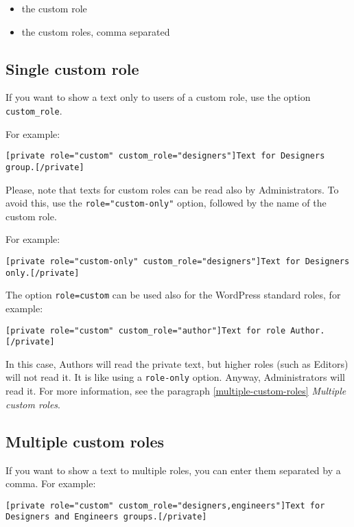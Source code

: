 \begin{itemize}
 \item the custom role
 \item the custom roles, comma separated
\end{itemize}

\subsection{Single custom role}

If you want to show a text only to users of a custom role, use the option
\verb+custom_role+.

For example:

\begin{lstlisting}
[private role="custom" custom_role="designers"]Text for Designers group.[/private]
\end{lstlisting}


Please, note that texts for custom roles can be read also by Administrators. To
avoid this, use the \verb+role="custom-only"+ option, followed by the name of
the custom role.

For example:

\begin{lstlisting}
[private role="custom-only" custom_role="designers"]Text for Designers only.[/private]
\end{lstlisting}

The option \verb+role=custom+ can be used also for the WordPress standard roles,
for example:

\begin{lstlisting}
[private role="custom" custom_role="author"]Text for role Author.[/private]
\end{lstlisting}

In this case, Authors will read the private text, but higher roles (such as
Editors) will not read it. It is like using a \verb+role-only+ option. Anyway,
Administrators will read it. For more information, see the paragraph
\vref{multiple-custom-roles} \textit{Multiple custom roles}.

\subsection{Multiple custom roles}\label{multiple-custom-roles}

If you want to show a text to multiple roles, you can enter them separated by a
comma. For example:

\begin{lstlisting}
[private role="custom" custom_role="designers,engineers"]Text for Designers and Engineers groups.[/private]
\end{lstlisting}

